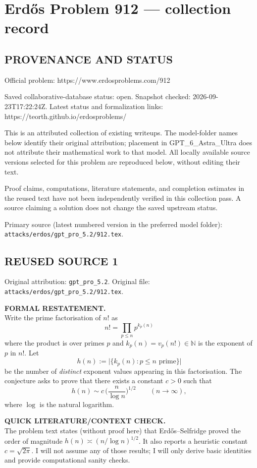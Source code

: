 \section*{Erd\H{o}s Problem 912 --- collection record}

\subsection*{PROVENANCE AND STATUS}
Official problem: https://www.erdosproblems.com/912

Saved collaborative-database status: open.
Snapshot checked: 2026-09-23T17:22:24Z.
Latest status and formalization links: https://teorth.github.io/erdosproblems/

This is an attributed collection of existing writeups. The model-folder names below identify their original attribution; placement in GPT\_6\_Astra\_Ultra does not attribute their mathematical work to that model. All locally available source versions selected for this problem are reproduced below, without editing their text.

Proof claims, computations, literature statements, and completion estimates in the reused text have not been independently verified in this collection pass. A source claiming a solution does not change the saved upstream status.

Primary source (latest numbered version in the preferred model folder): \texttt{attacks/erdos/gpt\_pro\_5.2/912.tex}.

\subsection*{REUSED SOURCE 1}
Original attribution: \texttt{gpt\_pro\_5.2}.
Original file: \texttt{attacks/erdos/gpt\_pro\_5.2/912.tex}.


\noindent\textbf{FORMAL RESTATEMENT.}\\
Write the prime factorisation of $n!$ as
\[
 n! = \prod_{p\le n} p^{k_p(n)}
\]
where the product is over primes $p$ and $k_p(n)=v_p(n!)\in\mathbb{N}$ is the exponent of $p$ in $n!$. Let
\[
 h(n):=\big|\{k_p(n): p\le n\text{ prime}\}\big|
\]
be the number of \emph{distinct} exponent values appearing in this factorisation. The conjecture asks to prove that there exists a constant $c>0$ such that
\[
 h(n) \sim c\,\Big(\frac{n}{\log n}\Big)^{1/2}\qquad (n\to\infty),
\]
where $\log$ is the natural logarithm.

\medskip
\noindent\textbf{QUICK LITERATURE/CONTEXT CHECK.}\\
The problem text states (without proof here) that Erd\H{o}s--Selfridge proved the order of magnitude $h(n)\asymp (n/\log n)^{1/2}$. It also reports a heuristic constant $c=\sqrt{2\pi}$. I will not assume any of those results; I will only derive basic identities and provide computational sanity checks.

